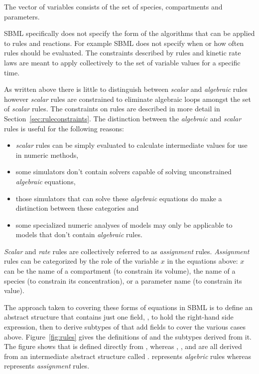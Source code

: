\documentclass[10pt]{cekarticle}
\newcommand{\vref}[1]{\ref{#1}}
\begin{document}
The vector of variables consists of the set of species,
compartments and parameters.  

SBML specifically does not specify the form of the algorithms that can be applied to rules and reactions.  For example SBML does not specify when or how often rules should be evaluated.  The constraints described by rules and kinetic rate laws are meant to apply collectively to the set of variable values for a specific time.

As written above there is little to distinguish between \emph{scalar} and \emph{algebraic} rules however \emph{scalar} rules are constrained to eliminate algebraic loops amongst the set of \emph{scalar} rules. The constraints on rules are described in more detail in Section~\ref{sec:ruleconstraints}. The distinction between the 
\emph{algebraic} and \emph{scalar} rules is useful for the following reasons:
\begin{itemize}
\item \emph{scalar} rules can be simply evaluated to calculate intermediate values for use in numeric methods,
\item some simulators don't contain solvers capable of solving unconstrained \emph{algebraic} equations,
\item those simulators that can solve these \emph{algebraic} equations do make
a distinction between these categories and
\item some specialized numeric analyses of models may only be applicable to models that don't contain \emph{algebraic} rules.
\end{itemize}

\emph{Scalar} and \emph{rate} rules are collectively referred to as \emph{assignment} rules.  \emph{Assignment} rules can be categorized by the role of the variable $x$ in the
equations above: $x$ can be the name of a compartment (to
constrain its volume), the name of a species (to constrain its
concentration), or a parameter name (to constrain its value).

The approach taken to covering these forms of equations in SBML is to define an
abstract  structure that contains just one field,
, to hold the right-hand side expression, then to
derive subtypes of  that add fields to cover the
various cases above. Figure~\vref{fig:rules} gives the definitions
of  and the subtypes derived from it.  The figure
shows that  is defined directly from
, whereas ,
, and  are
all derived from an intermediate abstract structure called
.   represents \emph{algebric} rules whereas  represents \emph{assignment} rules.
\end{document}
